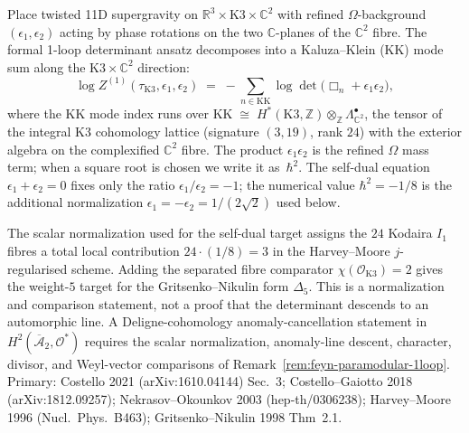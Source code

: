\begin{remark}
\label{rem:feyn-W15-refined-1loop}
Place twisted 11D supergravity on $\mathbb R^3 \times \mathrm{K3} \times
\mathbb C^2$ with refined $\Omega$-background $(\epsilon_1, \epsilon_2)$
acting by phase rotations on the two $\mathbb C$-planes of the $\mathbb
C^2$ fibre. The formal 1-loop determinant ansatz decomposes into a
Kaluza--Klein (KK) mode sum along the $\mathrm{K3} \times \mathbb C^2$
direction:
\begin{equation}
\label{eq:feyn-W15-1loop-logZ}
\log Z^{(1)}(\tau_{\mathrm K3}, \epsilon_1, \epsilon_2)
 \;=\; -\!\!\sum_{n \in \mathrm{KK}}\!\!
 \log \det\bigl(\Box_n + \epsilon_1\epsilon_2\bigr),
\end{equation}
where the KK mode index runs over
$\mathrm{KK} \;\cong\; H^*(\mathrm{K3}, \mathbb Z) \otimes_{\mathbb Z}
\Lambda^\bullet_{\mathbb C^2}$,
the tensor of the integral K3 cohomology lattice (signature $(3, 19)$,
rank $24$) with the exterior algebra on the complexified $\mathbb C^2$
fibre. The product $\epsilon_1\epsilon_2$ is the refined $\Omega$ mass
term; when a square root is chosen we write it as~$\hbar^2$.  The
self-dual equation $\epsilon_1+\epsilon_2=0$ fixes only the ratio
$\epsilon_1/\epsilon_2=-1$; the numerical value
$\hbar^2=-1/8$ is the additional normalization
$\epsilon_1=-\epsilon_2=1/(2\sqrt2)$ used below.

The scalar normalization used for the self-dual target assigns the
$24$ Kodaira $I_1$ fibres a total local contribution
$24\cdot(1/8)=3$ in the Harvey--Moore
$j$-regularised scheme.  Adding the separated fibre comparator
$\chi(\mathcal O_{\mathrm K3})=2$ gives the weight-$5$ target for the
Gritsenko--Nikulin form $\Delta_5$.  This is a normalization and
comparison statement, not a proof that the determinant descends to an
automorphic line.  A Deligne-cohomology anomaly-cancellation statement
in $H^2(\overline{\mathcal A}_2, \mathcal O^*)$ requires the scalar
normalization, anomaly-line descent, character, divisor, and Weyl-vector
comparisons of Remark~\ref{rem:feyn-paramodular-1loop}. Primary: Costello
2021 (arXiv:1610.04144) Sec.~3; Costello--Gaiotto 2018
(arXiv:1812.09257); Nekrasov--Okounkov 2003 (hep-th/0306238);
Harvey--Moore 1996 (Nucl.~Phys.~B463); Gritsenko--Nikulin 1998 Thm~2.1.
\end{remark}

